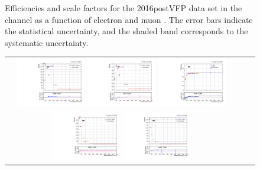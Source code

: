 \begin{figure}[htb]
\begin{center}
\begin{tabular}{ccc}
    \end{tabular}
    \caption{Efficiencies and scale factors for the 2016postVFP data set in the \emu channel as a function of electron and muon \pT.
            The error bars indicate the statistical uncertainty, and the shaded band corresponds to the systematic uncertainty.
            }
    \label{TrigSF_2016postVFP_1}
  \end{center}
\end{figure}

\begin{figure}[htb]
  \begin{center}
    \begin{tabular}{ccc}
      \includegraphics[width=0.30\textwidth]{fig_2016postVFP_TrigSF/g_lepApt_ee_MC.pdf}
      \includegraphics[width=0.30\textwidth]{fig_2016postVFP_TrigSF/g_lepApt_ee_data.pdf}
      \includegraphics[width=0.30\textwidth]{fig_2016postVFP_TrigSF/g_ee_lepApt_FullSystUncBand.pdf}\\
      \includegraphics[width=0.30\textwidth]{fig_2016postVFP_TrigSF/g_lepBpt_ee_MC.pdf}
      \includegraphics[width=0.30\textwidth]{fig_2016postVFP_TrigSF/g_lepBpt_ee_data.pdf}

\end{tabular}
\end{center}
\end{figure}
